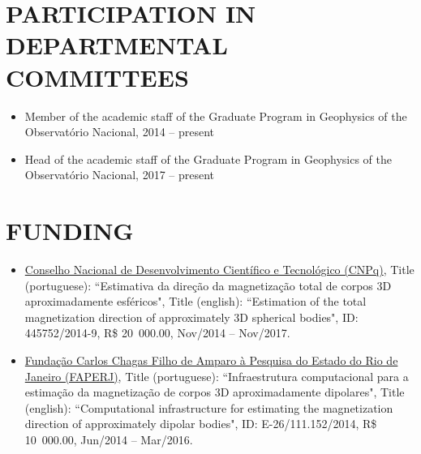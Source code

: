 \documentclass[paper=letter,fontsize=11pt]{scrartcl} %
\newcommand{\sepspace}{\vspace*{1em}}		%
\newcommand{\NewPart}[2]{\section*{\uppercase{#1} #2}}
\newcommand{\FundingEntry}[6]{
        \noindent #1, Title (portuguese): ``#2", Title (english): ``#3", ID: #4, R\$ #5, #6.}
\newcommand{\TalkEntry}[4]{
		\noindent #1, #2, #3 #4}
\begin{document}
\sepspace

\NewPart{Participation in departmental committees}{}

\begin{itemize}

\item Member of the academic staff of the Graduate Program in Geophysics of the 
Observat\'{o}rio Nacional, 2014 -- present

\item Head of the academic staff of the Graduate Program in Geophysics of the 
Observat\'{o}rio Nacional, 2017 -- present

\end{itemize}

\sepspace

\NewPart{Funding}{}

\begin{itemize}

\item\FundingEntry{\href{http://cnpq.br/pagina-inicial}{Conselho Nacional de Desenvolvimento Cient\'{i}fico e Tecnol\'{o}gico (CNPq)}}{Estimativa da dire\c{c}\~{a}o da magnetiza\c{c}\~{a}o total de corpos 3D aproximadamente esf\'{e}ricos}{Estimation of the total magnetization direction of approximately 3D spherical bodies}{445752/2014-9}{20~000.00}{Nov/2014 -- Nov/2017}

\item\FundingEntry{\href{http://www.faperj.br/}{Funda\c{c}\~{a}o Carlos Chagas Filho de Amparo \`{a} Pesquisa do Estado do Rio de Janeiro (FAPERJ)}}{Infraestrutura computacional para a estima\c{c}\~{a}o da magnetiza\c{c}\~{a}o de corpos 3D aproximadamente dipolares}{Computational infrastructure for estimating the magnetization direction of approximately dipolar bodies}{E-26/111.152/2014}{10~000.00}{Jun/2014 -- Mar/2016}

\end{itemize}

\end{document}
